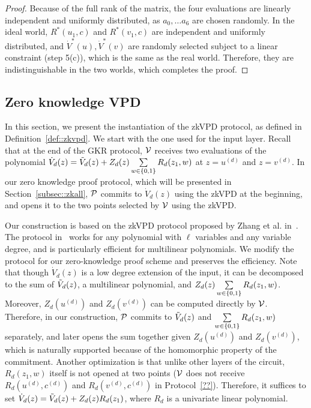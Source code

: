 \begin{proof}
Because of the full rank of the matrix, the four evaluations are linearly independent and uniformly distributed, as $a_0,\ldots a_6$ are chosen randomly. In the ideal world, $R^*(u_1,c)$ and $R^*(v_1,c)$ are independent and uniformly distributed, and $\dot{V}^*(u), \dot{V}^*(v)$ are randomly selected subject to a linear constraint (step 5(c)), which is the same as the real world. Therefore, they are indistinguishable in the two worlds, which completes the proof.   



\end{proof}

\subsection{Zero knowledge VPD}\label{subsec::our_zkvpd}
In this section, we present the instantiation of the zkVPD protocol, as defined in Definition~\ref{def::zkvpd}. We start with the one used for the input layer. Recall that at the end of the GKR protocol, $\V$ receives two evaluations of the polynomial $\dot{V}_d(z)=\tV_d(z)+Z_d(z)\sum\limits_{w \in\binary} R_d(z_1,w)$ at $z=u^{(d)}$ and $z=v^{(d)}$. In our zero knowledge proof protocol, which will be presented in Section~\ref{subsec::zkall}, $\P$ commits to $\dot{V}_d(z)$ using the zkVPD at the beginning, and opens it to the two points selected by $\V$ using the zkVPD.


Our construction is based on the zkVPD protocol proposed by Zhang et al. in~\cite{zkvpd}. The protocol in~\cite{zkvpd} works for any polynomial with $\ell$ variables and any variable degree, and is particularly efficient for multilinear polynomials. We modify the protocol for our zero-knowledge proof scheme and preserves the efficiency. Note that though $\dot{V}_d(z)$ is a low degree extension of the input, it can be decomposed to the sum of $\tV_d(z)$, a multilinear polynomial, and $Z_d(z)\sum\limits_{w \in\binary} R_d(z_1,w)$. Moreover, $Z_d(u^{(d)})$ and $Z_d(v^{(d)})$ can be computed directly by $\V$. Therefore, in our construction, $\P$ commits to $\tV_d(z)$ and $\sum\limits_{w \in\binary} R_d(z_1,w)$ separately, and later opens the sum together given $Z_d(u^{(d)})$ and $Z_d(v^{(d)})$, which is naturally supported because of the homomorphic property of the commitment. Another optimization is that unlike other layers of the circuit, $R_d(z_1,w)$ itself is not opened at two points ($\V$ does not receive $R_d(u^{(d)},c^{(d)})$ and $R_d(v^{(d)},c^{(d)})$ in Protocol~\ref{??}). Therefore, it suffices to set $\dot{V}_d(z)=\tV_d(z)+Z_d(z)R_d(z_1)$, where $R_d$ is a univariate linear polynomial.


